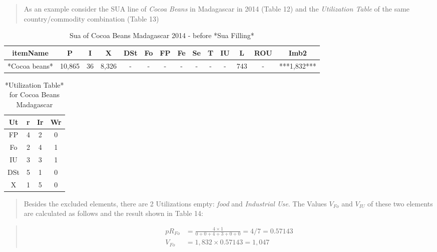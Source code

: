 \documentclass[]{article}
\begin{document}
\begin{quote}
As an example consider the SUA line of \emph{Cocoa Beans} in Madagascar
in 2014 (Table 12) and the \emph{Utilization Table} of the same
country/commodity combination (Table 13)
\end{quote}

\begin{table}

\caption{\label{tab:t11}Sua of Cocoa Beans Madagascar 2014 - before *Sua Filling*}
\centering
\begin{tabular}[t]{c|c|c|c|c|c|c|c|c|c|c|c|c|c}
\hline
itemName & P & I & X & DSt & Fo & FP & Fe & Se & T & IU & L & ROU & Imb2\\
\hline
*Cocoa beans* & 10,865 & 36 & 8,326 & - & - & - & - & - & - & - & 743 & - & ***1,832***\\
\hline
\end{tabular}
\end{table}

\begin{table}

\caption{\label{tab:t12}*Utilization Table* for Cocoa Beans Madagascar}
\centering
\begin{tabular}[t]{c|c|c|c}
\hline
Ut & r & Ir & Wr\\
\hline
FP & 4 & 2 & 0\\
\hline
Fo & 2 & 4 & 1\\
\hline
IU & 3 & 3 & 1\\
\hline
DSt & 5 & 1 & 0\\
\hline
X & 1 & 5 & 0\\
\hline
\end{tabular}
\end{table}

\begin{quote}
Besides the excluded elements, there are 2 Utilizations empty:
\emph{food} and \emph{Industrial Use}. The Values \(V_{Fo}\) and
\(V_{IU}\) of these two elements are calculated as follows and the
result shown in Table 14:
\end{quote}

\begin{quote}
\begin{equation}
\begin{aligned}
pR_{Fo} &= \frac{4\times 1}{0 + 0 + 4 + 3 + 0 + 0} = 4/7 = 0.57143 \\
V_{Fo} &= 1,832 \times 0.57143 = 1,047 
\end{aligned}
\end{equation}
\end{quote}
\end{document}
